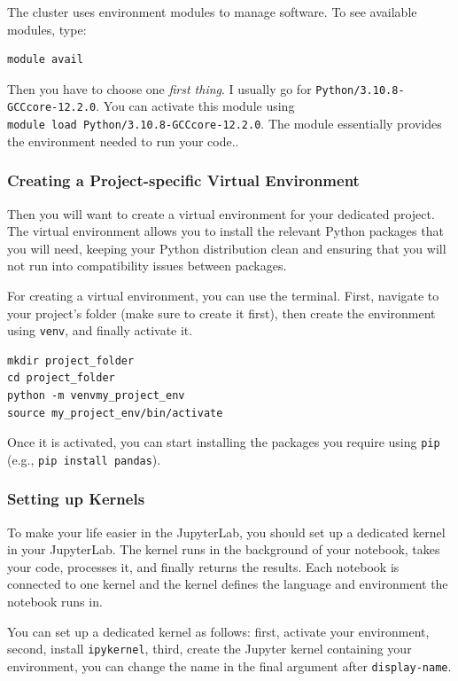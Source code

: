 \documentclass[
  letterpaper,
  DIV=11,
  numbers=noendperiod]{scrartcl}
\begin{document}
The cluster uses environment modules to manage software. To see
available modules, type:

\begin{verbatim}
module avail
\end{verbatim}

Then you have to choose one \emph{first thing}. I usually go for
\texttt{Python/3.10.8-GCCcore-12.2.0}. You can activate this module
using \texttt{module\ load\ Python/3.10.8-GCCcore-12.2.0}. The module
essentially provides the environment needed to run your code..

\subsubsection{Creating a Project-specific Virtual
Environment}\label{creating-a-project-specific-virtual-environment}

Then you will want to create a virtual environment for your dedicated
project. The virtual environment allows you to install the relevant
Python packages that you will need, keeping your Python distribution
clean and ensuring that you will not run into compatibility issues
between packages.

For creating a virtual environment, you can use the terminal. First,
navigate to your project's folder (make sure to create it first), then
create the environment using \texttt{venv}, and finally activate it.

\begin{verbatim}
mkdir project_folder  
cd project_folder  
python -m venvmy_project_env  
source my_project_env/bin/activate
\end{verbatim}

Once it is activated, you can start installing the packages you require
using \texttt{pip} (e.g., \texttt{pip\ install\ pandas}).

\subsubsection{Setting up Kernels}\label{setting-up-kernels}

To make your life easier in the JupyterLab, you should set up a
dedicated kernel in your JupyterLab. The kernel runs in the background
of your notebook, takes your code, processes it, and finally returns the
results. Each notebook is connected to one kernel and the kernel defines
the language and environment the notebook runs in.

You can set up a dedicated kernel as follows: first, activate your
environment, second, install \texttt{ipykernel}, third, create the
Jupyter kernel containing your environment, you can change the name in
the final argument after \texttt{display-name}.
\end{document}
